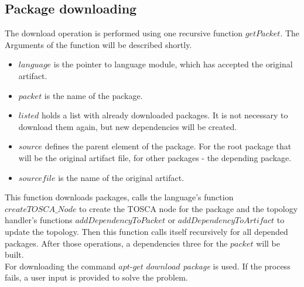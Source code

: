 \subsection*{Package downloading}
The download operation is performed using one recursive function $getPacket$. %
The Arguments of the function will be described shortly.
\begin{itemize}
	\item $language$ is the pointer to language module, which has accepted the original artifact.
	\item $packet$ is the name of the package.
	\item $listed$ holds a list with already downloaded packages.
	 It is not necessary to download them again, but new dependencies will be created.
	\item $source$ defines the parent element of the package. 
	For the root package that will be the original artifact file, for other packages - the depending package.
	\item $sourcefile$ is the name of the original artifact.
\end{itemize}
This function downloads packages, calls the language's function $createTOSCA\_Node$ to create the TOSCA node for the package and the topology handler's functions $addDependencyToPacket$ or $addDependencyToArtifact$ to update the topology. Then this function calls itself recursively for all depended packages.
After those operations, a dependencies three for the $packet$ will be built.\\
For downloading the command $apt$-$get$ $download$ \emph{package} is used. 
If the process fails, a user input is provided to solve the problem. 

